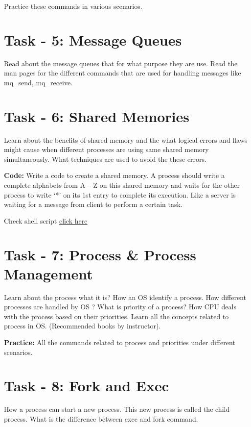 \documentclass[letterpaper,10pt,english]{sphinxmanual}
\begin{document}
Practice these commands in various scenarios.


\section{Task - 5: Message Queues}
\label{week-02:task-5-message-queues}
Read about the message queues that for what purpose they are use. Read the man pages for the different commands that are used for handling messages like mq\_send, mq\_receive.


\section{Task - 6: Shared Memories}
\label{week-02:task-6-shared-memories}
Learn about the benefits of shared memory and the what logical errors and flaws might cause when different processes are using same shared memory simultaneously. What techniques are used to avoid the these errors.

\textbf{Code:} Write a code to create a shared memory. A process should write a complete alphabets from A – Z on this shared memory and waits for the other process to write `*' on its 1st entry to complete its execution. Like a server is waiting for a message from client to perform a certain task.

Check shell script \href{https://github.com/Ahmer-444/personal-repo/tree/master/Shared\_Memory\_Client\_Server}{click here}


\section{Task - 7: Process \& Process Management}
\label{week-02:task-7-process-process-management}
Learn about the process what it is? How an OS identify a process. How different processes are handled by OS ? What is priority of a process? How CPU deals with the process based on their priorities. Learn all the concepts related to process in OS. (Recommended books by instructor).

\textbf{Practice:} All the commands related to process and priorities under different scenarios.


\section{Task - 8: Fork and Exec}
\label{week-02:task-8-fork-and-exec}
How a process can start a new process. This new process is called the child process. What is the difference between exec and fork command.
\end{document}
